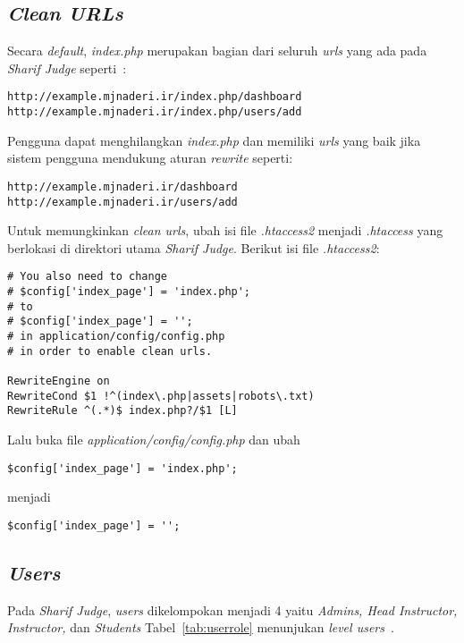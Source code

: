 \subsection{\textit{Clean URLs}}
Secara \textit{default}, \textit{index.php} merupakan bagian dari seluruh \textit{urls} yang ada pada \textit{Sharif Judge} seperti~\cite{mjnaderi:14:sharifjudgedoc}: 
\begin{lstlisting}[backgroundcolor = \color{lightgray}]
http://example.mjnaderi.ir/index.php/dashboard
http://example.mjnaderi.ir/index.php/users/add
\end{lstlisting}
Pengguna dapat menghilangkan \textit{index.php} dan memiliki \textit{urls} yang baik jika sistem pengguna mendukung aturan \textit{rewrite} seperti:  
\begin{lstlisting}[backgroundcolor = \color{lightgray}]
http://example.mjnaderi.ir/dashboard
http://example.mjnaderi.ir/users/add
\end{lstlisting}

Untuk memungkinkan \textit{clean urls}, ubah isi file \textit{.htaccess2} menjadi \textit{.htaccess} yang berlokasi di direktori utama \textit{Sharif Judge}.
Berikut isi file \textit{.htaccess2}: 
\begin{lstlisting}[backgroundcolor = \color{lightgray}]
# You also need to change 
# $config['index_page'] = 'index.php';
# to
# $config['index_page'] = '';
# in application/config/config.php
# in order to enable clean urls.

RewriteEngine on
RewriteCond $1 !^(index\.php|assets|robots\.txt)
RewriteRule ^(.*)$ index.php?/$1 [L]
\end{lstlisting}
Lalu buka file \textit{application/config/config.php} dan ubah  
\begin{lstlisting}[backgroundcolor = \color{lightgray}]
$config['index_page'] = 'index.php';
\end{lstlisting}
menjadi
\begin{lstlisting}[backgroundcolor = \color{lightgray}]
$config['index_page'] = '';
\end{lstlisting}

\subsection{\textit{Users}}
Pada \textit{Sharif Judge}, \textit{users} dikelompokan menjadi 4 yaitu \textit{Admins, Head Instructor, Instructor, }dan \textit{Students}
Tabel~\ref{tab:userrole} menunjukan \textit{level users}~\cite{mjnaderi:14:sharifjudgedoc}.

